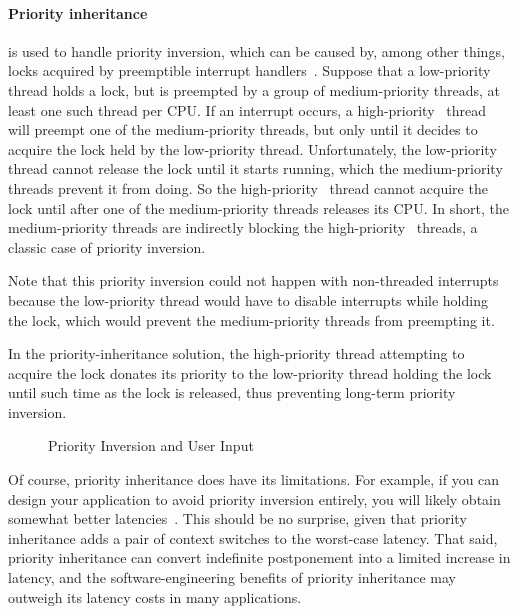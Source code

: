 \paragraph{Priority inheritance} is used to handle priority inversion,
which can be caused by, among other things, locks acquired by
preemptible interrupt handlers~\cite{LuiSha1990PriorityInheritance}.
Suppose that a low-priority thread holds a lock, but is preempted by
a group of medium-priority threads, at least one such thread per CPU\@.
If an interrupt occurs, a high-priority \IRQ\ thread will preempt one
of the medium-priority threads, but only until it decides to acquire
the lock held by the low-priority thread.
Unfortunately, the low-priority thread cannot release the lock until
it starts running, which the medium-priority threads prevent it from
doing.
So the high-priority \IRQ\ thread cannot acquire the lock until after one
of the medium-priority threads releases its CPU\@.
In short, the medium-priority threads are indirectly blocking the
high-priority \IRQ\ threads, a classic case of priority inversion.

Note that this priority inversion could not happen with non-threaded
interrupts because the low-priority thread would have to disable interrupts
while holding the lock, which would prevent the medium-priority
threads from preempting it.

In the priority-inheritance solution, the high-priority thread attempting
to acquire the lock donates its priority to the low-priority thread holding
the lock until such time as the lock is released, thus preventing long-term
priority inversion.

\begin{figure}[tb]
\centering
{}
\caption{Priority Inversion and User Input}
\end{figure}

Of course, priority inheritance does have its limitations.
For example, if you can design your application to avoid priority
inversion entirely, you will likely obtain somewhat better
latencies~\cite{VictorYodaiken2004a}.
This should be no surprise, given that priority inheritance adds
a pair of context switches to the worst-case latency.
That said, priority inheritance can convert indefinite postponement
into a limited increase in latency, and the software-engineering
benefits of priority inheritance may outweigh its latency costs in
many applications.

